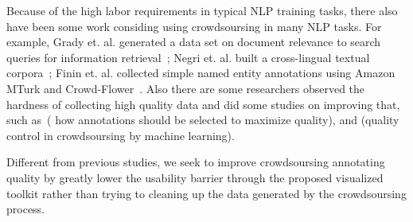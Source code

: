 Because of the high labor requirements in typical NLP training tasks,
there also have been some work considing using crowdsoursing in many
NLP tasks. For example, Grady et. al. generated a data set on document
relevance to search queries for information
retrieval~\cite{Grady2010CDR18666961866723}; Negri et. al. built a
cross-lingual textual corpora~\cite{Negri2011DCC21454322145510};
Finin et. al. collected simple named entity annotations using Amazon MTurk
and Crowd-Flower~\cite{Finin2010ANE18666961866709}. Also there are
some researchers observed the hardness of collecting high quality data
and did some studies on improving that, such
as~\cite{Hsueh2009DQC15641311564137}( how annotations should be
selected to maximize quality), and \cite{lease2011quality} (quality
control in crowdsoursing by machine learning).

Different from previous studies, we seek to improve crowdsoursing
annotating quality by greatly lower the usability barrier through the
proposed visualized toolkit rather than trying to cleaning up the data
generated by the crowdsoursing process. 
